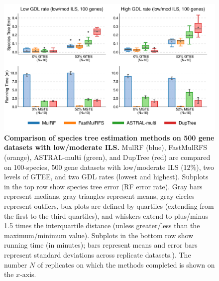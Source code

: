 \begin{figure}[!h]
\centering
\includegraphics[width=\textwidth]{figures/fastmulrfs-fig4.pdf}
	\caption{{\bf Comparison of species tree estimation methods on 500 gene datasets with low/moderate ILS.} 
	MulRF (blue), FastMulRFS (orange), ASTRAL-multi (green), and DupTree (red) are compared on 100-species, 500 gene datasets with low/moderate ILS (12\%), two levels of GTEE, and two GDL rates (lowest and highest).
	Subplots in the top row show species tree error (RF error rate).
Gray bars represent medians, gray triangles represent means, gray circles represent outliers, box plots are defined by quartiles (extending from the first to the third quartiles), and whiskers extend to plus/minus 1.5 times the interquartile distance (unless greater/less than the maximum/minimum value).
Subplots in the bottom row show running time (in minutes); bars represent means and error bars represent standard deviations across replicate datasets.).
The number $N$ of replicates on which the methods completed is shown on the $x$-axis.}
\label{fig:fastmulrfs-500gen}
\end{figure}

